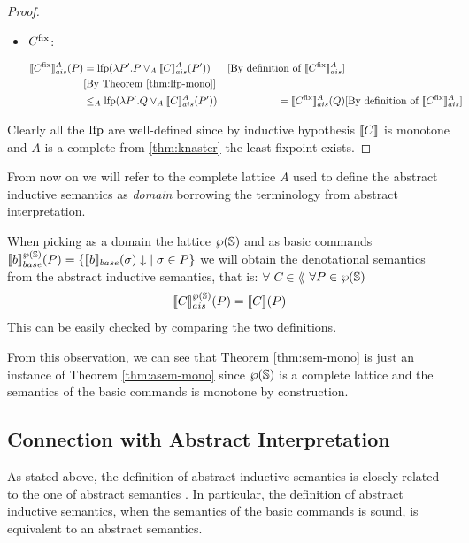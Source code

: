 \documentclass[
  10pt,       %
  twoside,    %
  a4paper,    %
  english,    %
  tikz,       %
  openright,  %
]{book}
\begin{document}
\begin{proof}
\begin{itemize}
    \item $C^\fix$:

      \begin{align*}
        \asem{C^\fix}(P) 
          &= \lfp(\lambda P'. P \join_A \asem{C}(P'))
          &\text{[By definition of $\asem{C^\fix}$]}\\
          &\text{[By Theorem \ref{thm:lfp-mono}]}\\
          &\leq_A \lfp(\lambda P'. Q \join_A \asem{C}(P'))
          &= \asem{C^\fix}(Q) 
          &\text{[By definition of $\asem{C^\fix}$]}\\
      \end{align*}
  \end{itemize}


  Clearly all the $\lfp$ are well-defined since by inductive hypothesis
  $\sem{C}$ is monotone and $A$ is a complete from 
  \ref{thm:knaster} the least-fixpoint exists.
\end{proof}

From now on we will refer to the complete lattice $A$ used to define the abstract
inductive semantics as \textit{domain} borrowing the terminology from abstract
interpretation.

\begin{observation}
  \label{obs:post}
  When picking as a domain the lattice $\pow{\states}$ and as basic commands
  $\bsem{b}^{\pow{\states}}(P) = \{ \bsem{b}(\sigma)\downarrow \; \mid \sigma 
  \in P \}$ we will obtain the denotational semantics from the 
  abstract inductive semantics, that is: $\forall \; C \in \lang$ $\forall P \in 
  \pow{\states}$ 
  $$\asem[\pow{\states}]{C}(P) = \sem{C}(P)$$
  This can be easily checked by comparing the two definitions.
\end{observation}

From this observation, we can see that Theorem \ref{thm:sem-mono} is just an
instance of Theorem \ref{thm:asem-mono} since $\pow{\states}$ is a
complete lattice and the semantics of the basic commands is monotone by
construction.

\subsection{Connection with Abstract Interpretation}

As stated above, the definition of abstract inductive semantics is closely
related to the one of abstract semantics \cite{Cousot77}. In particular, the 
definition of abstract inductive semantics, when the semantics of the basic
commands is sound, is equivalent to an abstract semantics.
\end{document}
